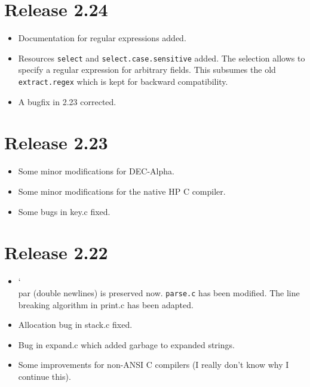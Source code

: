 \documentclass[11pt,a4paper]{scrartcl}
\newcommand\rsc[1]{\texttt{#1}}
\newcommand\File[1]{\textsf{#1}}
\newenvironment{Release}[2]{%
  \def\tmp{#2}%
  \section*{Release #1 \ifx\tmp\empty\else{\normalsize[#2]}\fi}
  \begin{itemize}
}{\end{itemize}}
\newenvironment{Fix}[1]{\item }{}
\newenvironment{New}[1]{\item }{}
\newenvironment{Doc}[1]{\item }{}
\newenvironment{Update}[1]{\item }{}
\newcommand\BS{\char`\\}
\begin{document}
\begin{multicols}
 \begin{Release}{2.24}{}
  \begin{Doc}{gene}
    Documentation for regular expressions added.
  \end{Doc}
  \begin{New}{gene}
    Resources \rsc{select} and
    \rsc{select.case.sensitive} added. The selection allows to
    specify a regular expression for arbitrary fields. This subsumes
    the old \rsc{extract.regex} which is kept for backward
    compatibility.
  \end{New}
  \begin{Fix}{gene}
    A bugfix in 2.23 corrected.
  \end{Fix}
 \end{Release}

 \begin{Release}{2.23}{}
  \begin{Update}{gene}
    Some minor modifications for DEC-Alpha.
  \end{Update}
  \begin{Update}{gene}
    Some minor modifications for the native HP C compiler.
  \end{Update}
  \begin{Fix}{gene}
    Some bugs in \File{key.c} fixed.
  \end{Fix}
 \end{Release}

 \begin{Release}{2.22}{}
  \begin{Update}{gene}
    \BS par (double newlines) is preserved now. \rsc{parse.c}
    has been modified. The line breaking algorithm in \File{print.c}
    has been adapted.
  \end{Update}
  \begin{Fix}{gene}
    Allocation bug in \File{stack.c} fixed.
  \end{Fix}
  \begin{Fix}{gene}
    Bug in \File{expand.c} which added garbage to expanded strings.
  \end{Fix}
  \begin{Update}{gene}
    Some improvements for non-ANSI C compilers (I really don't know
    why I continue this).
  \end{Update}
 \end{Release}


\end{multicols}
\end{document}
